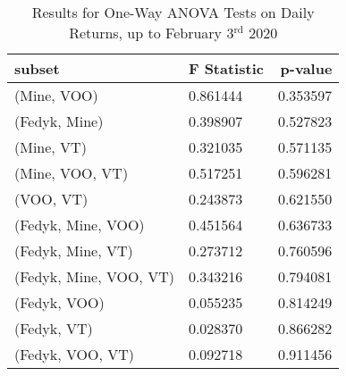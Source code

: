 \begin{appendices}
\begin{table}[ht]
\centering
\caption{Results for One-Way ANOVA Tests on Daily Returns, up to February 3$^\text{rd}$ 2020}
    \begin{tabular}{lll}
    \toprule
        \textbf{subset}        & \multicolumn{1}{r}{\textbf{F Statistic}} & \multicolumn{1}{r}{\textbf{p-value}} \\ \midrule
        (Mine, VOO)                         & 0.861444                       & 0.353597                               \\
        (Fedyk, Mine)                       & 0.398907                       & 0.527823                               \\
        (Mine, VT)                          & 0.321035                       & 0.571135                               \\
        (Mine, VOO, VT)                     & 0.517251                       & 0.596281                               \\
        (VOO, VT)                           & 0.243873                       & 0.621550                               \\
        (Fedyk, Mine, VOO)                  & 0.451564                       & 0.636733                               \\
        (Fedyk, Mine, VT)                   & 0.273712                       & 0.760596                               \\
        (Fedyk, Mine, VOO, VT)              & 0.343216                       & 0.794081                               \\
        (Fedyk, VOO)                        & 0.055235                       & 0.814249                               \\
        (Fedyk, VT)                         & 0.028370                       & 0.866282                               \\
        (Fedyk, VOO, VT)                    & 0.092718                       & 0.911456                              
    \end{tabular}
\label{tab:anova_before}
\end{table}



\end{appendices}

